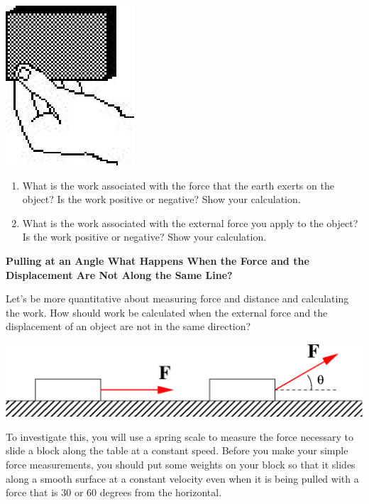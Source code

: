 \vspace{0.3cm}
{\par\centering \includegraphics{workAndKE/work_power_fig5.eps} \par}
\vspace{0.3cm}

\begin{enumerate}
\item What is the work associated with the force that the earth exerts on the object? Is the work positive or negative? Show your calculation.
\vspace{20mm}

\item What is the work associated with the external force you apply to the object? Is the work positive or negative? Show your calculation.
\vspace{20mm}

\end{enumerate}
\textbf{Pulling at an Angle What Happens When the Force and the Displacement
Are Not Along the Same Line? }

Let's be more quantitative about measuring force and distance and calculating
the work. How should work be calculated when the external force and the displacement
of an object are not in the same direction?

\vspace{0.3cm}
{\par\centering \includegraphics[width=5.5in]{workAndKE/work_power_fig6b.eps} \par}
\vspace{0.3cm}

To investigate this, you will use a spring scale to measure the force necessary
to slide a block along the table at a constant speed. Before you make your simple 
force measurements, you should put some weights on your block so that it slides 
along a smooth surface at a constant velocity even when it is being pulled with 
a force that is 30 or 60 degrees from the horizontal.

